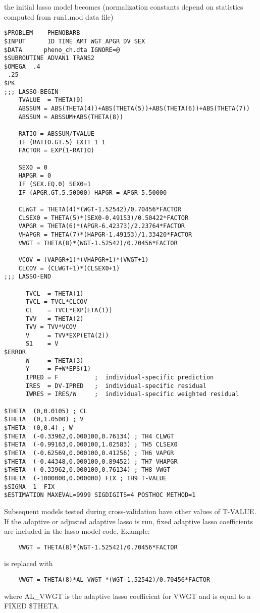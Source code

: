 the initial lasso model becomes (normalization constants depend on statistics computed from run1.mod data file)

\begin{verbatim}
$PROBLEM    PHENOBARB
$INPUT      ID TIME AMT WGT APGR DV SEX
$DATA      pheno_ch.dta IGNORE=@
$SUBROUTINE ADVAN1 TRANS2
$OMEGA  .4
 .25
$PK
;;; LASSO-BEGIN
    TVALUE  = THETA(9)
    ABSSUM = ABS(THETA(4))+ABS(THETA(5))+ABS(THETA(6))+ABS(THETA(7))
    ABSSUM = ABSSUM+ABS(THETA(8))

    RATIO = ABSSUM/TVALUE
    IF (RATIO.GT.5) EXIT 1 1
    FACTOR = EXP(1-RATIO)

    SEX0 = 0
    HAPGR = 0
    IF (SEX.EQ.0) SEX0=1
    IF (APGR.GT.5.50000) HAPGR = APGR-5.50000

    CLWGT = THETA(4)*(WGT-1.52542)/0.70456*FACTOR
    CLSEX0 = THETA(5)*(SEX0-0.49153)/0.50422*FACTOR
    VAPGR = THETA(6)*(APGR-6.42373)/2.23764*FACTOR
    VHAPGR = THETA(7)*(HAPGR-1.49153)/1.33420*FACTOR
    VWGT = THETA(8)*(WGT-1.52542)/0.70456*FACTOR

    VCOV = (VAPGR+1)*(VHAPGR+1)*(VWGT+1)
    CLCOV = (CLWGT+1)*(CLSEX0+1)
;;; LASSO-END

      TVCL  = THETA(1)
      TVCL = TVCL*CLCOV
      CL    = TVCL*EXP(ETA(1))
      TVV   = THETA(2)
      TVV = TVV*VCOV
      V     = TVV*EXP(ETA(2))
      S1    = V
$ERROR
      W     = THETA(3)
      Y     = F+W*EPS(1)
      IPRED = F          ;  individual-specific prediction
      IRES  = DV-IPRED   ;  individual-specific residual
      IWRES = IRES/W     ;  individual-specific weighted residual

$THETA  (0,0.0105) ; CL
$THETA  (0,1.0500) ; V
$THETA  (0,0.4) ; W
$THETA  (-0.33962,0.000100,0.76134) ; TH4 CLWGT
$THETA  (-0.99163,0.000100,1.02583) ; TH5 CLSEX0
$THETA  (-0.62569,0.000100,0.41256) ; TH6 VAPGR
$THETA  (-0.44348,0.000100,0.89452) ; TH7 VHAPGR
$THETA  (-0.33962,0.000100,0.76134) ; TH8 VWGT
$THETA  (-1000000,0.000000) FIX ; TH9 T-VALUE
$SIGMA  1  FIX
$ESTIMATION MAXEVAL=9999 SIGDIGITS=4 POSTHOC METHOD=1
\end{verbatim}

Subsequent models tested during cross-validation have other values of T-VALUE.
If the adaptive or adjusted adaptive lasso is run, fixed adaptive lasso coefficients are included in the lasso model 
code. Example:
\begin{verbatim}
    VWGT = THETA(8)*(WGT-1.52542)/0.70456*FACTOR
\end{verbatim}
is replaced with
\begin{verbatim}
    VWGT = THETA(8)*AL_VWGT *(WGT-1.52542)/0.70456*FACTOR
\end{verbatim}
where AL\_VWGT is the adaptive lasso coefficient for VWGT and is equal to a FIXED \$THETA. 

